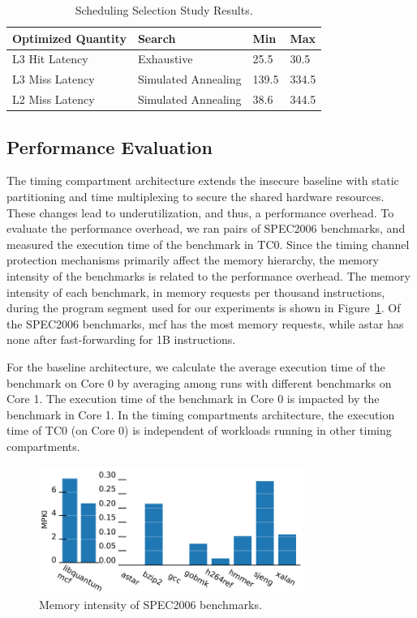 \begin{table}
    \caption{Scheduling Selection Study Results.}
    \centering
    \begin{tabular}{|l|l|l|l|}
        \hline
        \multicolumn{1}{|l|}{Optimized Quantity} & Search & Min & Max \\\hline
        \multicolumn{1}{|l|}{L3 Hit Latency} & Exhaustive & 25.5 & 30.5 \\\hline
        \multicolumn{1}{|l|}{L3 Miss Latency} & Simulated Annealing& 139.5 & 334.5 \\\hline
        \multicolumn{1}{|l|}{L2 Miss Latency} & Simulated Annealing& 38.6 & 344.5 \\\hline
    \end{tabular}
    \label{tab:coord_results}
\end{table}

\subsection{Performance Evaluation}

The timing compartment architecture extends the insecure baseline with
static partitioning and time multiplexing to secure the shared hardware 
resources. These changes lead to underutilization, and thus, a performance
overhead. To evaluate the performance overhead, we ran pairs of
SPEC2006 benchmarks, and measured the execution time of the benchmark
in TC0. Since the timing channel protection mechanisms primarily affect the memory 
hierarchy, the memory intensity of the benchmarks is related to the performance 
overhead.
The memory intensity of each benchmark, in memory requests per thousand 
instructions, during the program segment used for our experiments is shown in
Figure~\ref{fig:memstudy}. Of the SPEC2006 benchmarks, mcf has the most memory 
requests, while astar has none after fast-forwarding for 1B instructions.

For the baseline architecture, we calculate the average execution time of the 
benchmark on Core 0 by averaging among runs with different benchmarks on Core 1. 
The execution time of the benchmark in Core 0 is impacted by the benchmark in 
Core 1. In the timing compartments architecture, the execution time of TC0 (on 
Core 0) is independent of workloads running in other timing compartments.

\begin{figure}
    \begin{center}
        \includegraphics[width=3.4in]{figs/mpki_merged.pdf}
        \caption{Memory intensity of SPEC2006 benchmarks.}
        \label{fig:memstudy}
    \end{center}
\end{figure}

